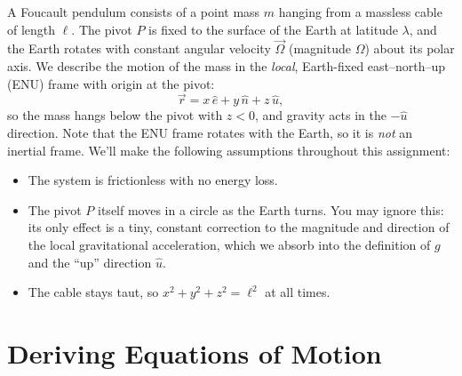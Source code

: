 \documentclass[11pt,letterpaper]{article}
\newcommand{\ehat}{\hat{e}}
\newcommand{\nhat}{\hat{n}}
\newcommand{\uhat}{\hat{u}}
\begin{document}
\noindent A Foucault pendulum consists of a point mass $m$ hanging from a massless cable of length $\ell$. The pivot $P$ is fixed to the surface of the Earth at latitude $\lambda$, and the Earth rotates with constant angular velocity $\vec{\Omega}$ (magnitude $\Omega$) about its polar axis. We describe the motion of the mass in the \emph{local}, Earth-fixed east--north--up (ENU) frame with origin at the pivot:
\[
\vec{r} = x\,\ehat + y\,\nhat + z\,\uhat,
\]
so the mass hangs below the pivot with $z<0$, and gravity acts in the $-\uhat$ direction. Note that the ENU frame rotates with the Earth, so it is \emph{not} an inertial frame. We'll make the following assumptions throughout this assignment:
\begin{itemize}
    \item The system is frictionless with no energy loss.
    \item The pivot $P$ itself moves in a circle as the Earth turns. You may ignore this: its only effect is a tiny, constant correction to the magnitude and direction of the local gravitational acceleration, which we absorb into the definition of $g$ and the ``up'' direction $\uhat$.
    \item The cable stays taut, so $x^2+y^2+z^2=\ell^2$ at all times.
\end{itemize}

\section{Deriving Equations of Motion}
\end{document}
